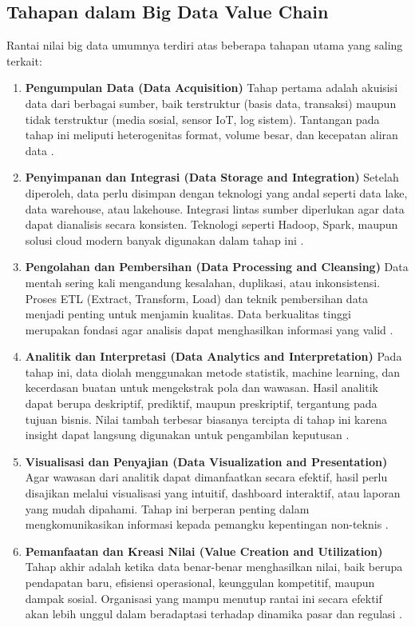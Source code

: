 \subsection{Tahapan dalam Big Data Value Chain}

Rantai nilai big data umumnya terdiri atas beberapa tahapan utama yang saling terkait:

\begin{enumerate}
	\item \textbf{Pengumpulan Data (Data Acquisition)}  
	Tahap pertama adalah akuisisi data dari berbagai sumber, baik terstruktur (basis data, transaksi) maupun tidak terstruktur (media sosial, sensor IoT, log sistem). Tantangan pada tahap ini meliputi heterogenitas format, volume besar, dan kecepatan aliran data \cite{jagadish2014}. 
	
	\item \textbf{Penyimpanan dan Integrasi (Data Storage and Integration)}  
	Setelah diperoleh, data perlu disimpan dengan teknologi yang andal seperti data lake, data warehouse, atau lakehouse. Integrasi lintas sumber diperlukan agar data dapat dianalisis secara konsisten. Teknologi seperti Hadoop, Spark, maupun solusi cloud modern banyak digunakan dalam tahap ini \cite{armbrust2021lakehouse}. 
	
	\item \textbf{Pengolahan dan Pembersihan (Data Processing and Cleansing)}  
	Data mentah sering kali mengandung kesalahan, duplikasi, atau inkonsistensi. Proses ETL (Extract, Transform, Load) dan teknik pembersihan data menjadi penting untuk menjamin kualitas. Data berkualitas tinggi merupakan fondasi agar analisis dapat menghasilkan informasi yang valid \cite{rahm2000dataquality}. 
	
	\item \textbf{Analitik dan Interpretasi (Data Analytics and Interpretation)}  
	Pada tahap ini, data diolah menggunakan metode statistik, machine learning, dan kecerdasan buatan untuk mengekstrak pola dan wawasan. Hasil analitik dapat berupa deskriptif, prediktif, maupun preskriptif, tergantung pada tujuan bisnis. Nilai tambah terbesar biasanya tercipta di tahap ini karena insight dapat langsung digunakan untuk pengambilan keputusan \cite{provost2013datascience}. 
	
	\item \textbf{Visualisasi dan Penyajian (Data Visualization and Presentation)}  
	Agar wawasan dari analitik dapat dimanfaatkan secara efektif, hasil perlu disajikan melalui visualisasi yang intuitif, dashboard interaktif, atau laporan yang mudah dipahami. Tahap ini berperan penting dalam mengkomunikasikan informasi kepada pemangku kepentingan non-teknis \cite{few2006dashboard}. 
	
	\item \textbf{Pemanfaatan dan Kreasi Nilai (Value Creation and Utilization)}  
	Tahap akhir adalah ketika data benar-benar menghasilkan nilai, baik berupa pendapatan baru, efisiensi operasional, keunggulan kompetitif, maupun dampak sosial. Organisasi yang mampu menutup rantai ini secara efektif akan lebih unggul dalam beradaptasi terhadap dinamika pasar dan regulasi \cite{labreuche2020}. 
\end{enumerate}

